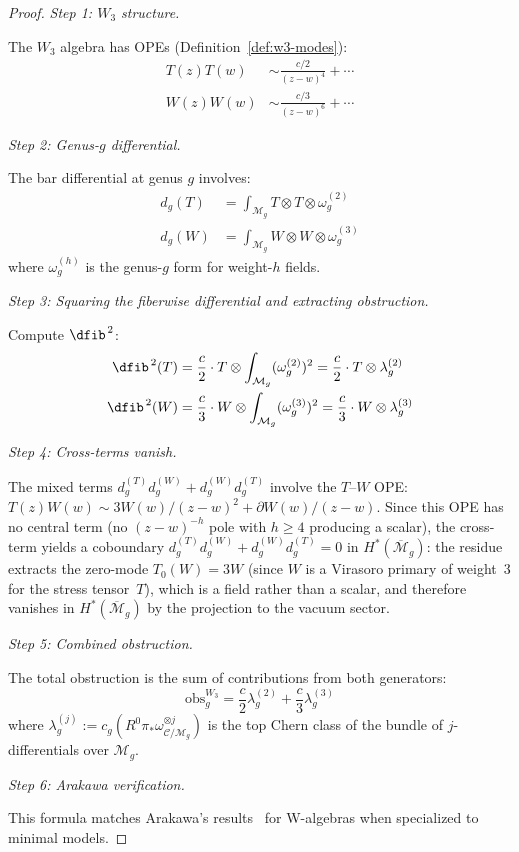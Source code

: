 \begin{proof}

\emph{Step 1: $W_3$ structure.}

The $W_3$ algebra has OPEs (Definition~\ref{def:w3-modes}):
\begin{align}
T(z)T(w) &\sim \frac{c/2}{(z-w)^4} + \cdots \\
W(z)W(w) &\sim \frac{c/3}{(z-w)^6} + \cdots
\end{align}

\emph{Step 2: Genus-$g$ differential.}

The bar differential at genus $g$ involves:
\begin{align}
d_g(T) &= \int_{\mathcal{M}_g} T \otimes T \otimes \omega_g^{(2)} \\
d_g(W) &= \int_{\mathcal{M}_g} W \otimes W \otimes \omega_g^{(3)}
\end{align}
where $\omega_g^{(h)}$ is the genus-$g$ form for weight-$h$ fields.

\emph{Step 3: Squaring the fiberwise differential and extracting obstruction.}

Compute $\dfib^{\,2}$:
\begin{align}
\dfib^{\,2}(T) &= \frac{c}{2} \cdot T \otimes \int_{\mathcal{M}_g} (\omega_g^{(2)})^2
= \frac{c}{2} \cdot T \otimes \lambda_g^{(2)} \\
\dfib^{\,2}(W) &= \frac{c}{3} \cdot W \otimes \int_{\mathcal{M}_g} (\omega_g^{(3)})^2
= \frac{c}{3} \cdot W \otimes \lambda_g^{(3)}
\end{align}

\emph{Step 4: Cross-terms vanish.}

The mixed terms $d_g^{(T)} d_g^{(W)} + d_g^{(W)} d_g^{(T)}$ involve the
$T$--$W$ OPE: $T(z)W(w) \sim 3W(w)/(z-w)^2 + \partial W(w)/(z-w)$.
Since this OPE has no central term (no $(z-w)^{-h}$ pole with $h \geq 4$
producing a scalar), the cross-term yields a coboundary
$d_g^{(T)} d_g^{(W)} + d_g^{(W)} d_g^{(T)} = 0$ in $H^*(\overline{\mathcal{M}}_g)$:
the residue extracts the zero-mode $T_0(W) = 3W$ (since $W$ is a Virasoro primary of weight~$3$
for the stress tensor~$T$), which is a field rather than a scalar,
and therefore vanishes in $H^*(\overline{\mathcal{M}}_g)$ by the projection to the vacuum sector.

\emph{Step 5: Combined obstruction.}

The total obstruction is the sum of contributions from both generators:
\[\text{obs}_g^{W_3} = \frac{c}{2} \lambda_g^{(2)} + \frac{c}{3} \lambda_g^{(3)}\]
where $\lambda_g^{(j)} := c_g(R^0\pi_* \omega_{\mathcal{C}/\mathcal{M}_g}^{\otimes j})$ is the top Chern class of the bundle of $j$-differentials over $\mathcal{M}_g$.

\emph{Step 6: Arakawa verification.}

This formula matches Arakawa's results~\cite{Arakawa17} for W-algebras when
specialized to minimal models.
\end{proof}

